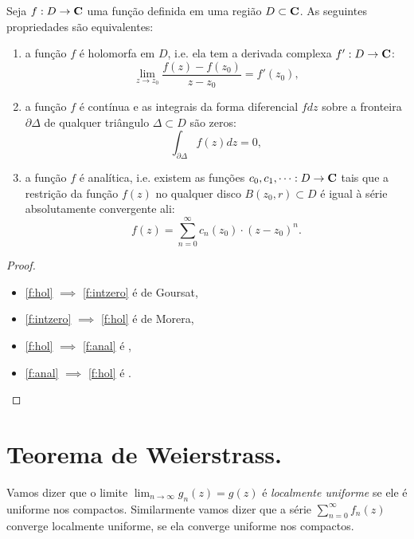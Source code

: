 \begin{teorema}
\label{t:criterio}
Seja $f: D \to \mathbf{C}$ uma função definida em uma região $D\subset \mathbf{C}$. 
As seguintes propriedades são equivalentes:
\begin{enumerate}
\item \label{f:hol}
a função $f$ é holomorfa em $D$, i.e. ela tem a derivada complexa $f' : D \to \mathbf{C}$:
\[ \lim_{z\to z_0} \frac{f(z)-f(z_0)}{z-z_0} = f'(z_0), \]
\item \label{f:intzero}
a função $f$ é contínua e as integrais da forma diferencial $f dz$
sobre a fronteira $\partial \Delta$
de qualquer triângulo $\Delta \subset D$ são zeros: 
\[ \int_{\partial \Delta} f(z) dz = 0 , \]
\item \label{f:anal}
a função $f$ é analítica, i.e. existem as funções $c_0,c_1,\dots: D\to\mathbf{C}$ tais que
a restrição da função $f(z)$ no qualquer disco $B(z_0,r) \subset D$
é igual à série absolutamente convergente ali:
\[ f(z) = \sum_{n=0}^\infty c_n(z_0) \cdot (z-z_0)^n. \]
\end{enumerate}
\end{teorema}
\begin{proof}
\begin{itemize}
\item \eqref{f:hol} $\implies$ \eqref{f:intzero} é  de Goursat,
\item \eqref{f:intzero} $\implies$ \eqref{f:hol} é  de Morera,
\item \eqref{f:hol} $\implies$ \eqref{f:anal} é ,
\item \eqref{f:anal} $\implies$ \eqref{f:hol} é .
\end{itemize}
\end{proof}

\section{Teorema de Weierstrass.}

Vamos dizer que o limite $\lim_{n\to\infty} g_n(z) = g(z)$ é \emph{localmente uniforme}
se ele é uniforme nos compactos. Similarmente vamos dizer que a série $\sum_{n=0}^\infty f_n(z)$
converge localmente uniforme, se ela converge uniforme nos compactos.


